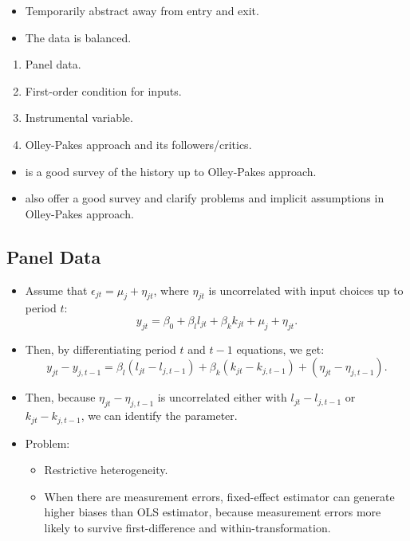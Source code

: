 \documentclass[
]{book}
\providecommand{\tightlist}{%
  \setlength{\itemsep}{0pt}\setlength{\parskip}{0pt}}
\begin{document}
\begin{itemize}
\tightlist
\item
  Temporarily abstract away from entry and exit.
\item
  The data is balanced.
\end{itemize}

\begin{enumerate}
\def\labelenumi{\arabic{enumi}.}
\tightlist
\item
  Panel data.
\item
  First-order condition for inputs.
\item
  Instrumental variable.
\item
  Olley-Pakes approach and its followers/critics.
\end{enumerate}

\begin{itemize}
\tightlist
\item
  \citet{Griliches1998} is a good survey of the history up to Olley-Pakes approach.
\item
  \citet{Ackerberg2015} also offer a good survey and clarify problems and implicit assumptions in Olley-Pakes approach.
\end{itemize}

\hypertarget{panel-data}{%
\subsection{Panel Data}\label{panel-data}}

\begin{itemize}
\tightlist
\item
  Assume that \(\epsilon_{jt} = \mu_j + \eta_{jt}\), where \(\eta_{jt}\) is uncorrelated with input choices up to period \(t\):
  \begin{equation}
  y_{jt} = \beta_0 + \beta_l l_{jt} + \beta_k k_{jt} + \mu_j + \eta_{jt}.
  \end{equation}
\item
  Then, by differentiating period \(t\) and \(t - 1\) equations, we get:
  \begin{equation}
  y_{jt} - y_{j, t - 1}= \beta_l (l_{jt} - l_{j, t - 1}) + \beta_k (k_{jt} - k_{j, t - 1}) + (\eta_{jt} - \eta_{j, t - 1}).
  \end{equation}
\item
  Then, because \(\eta_{jt} - \eta_{j, t - 1}\) is uncorrelated either with \(l_{jt} - l_{j, t - 1}\) or \(k_{jt} - k_{j, t - 1}\), we can identify the parameter.
\item
  Problem:

  \begin{itemize}
  \tightlist
  \item
    Restrictive heterogeneity.
  \item
    When there are measurement errors, fixed-effect estimator can generate higher biases than OLS estimator, because measurement errors more likely to survive first-difference and within-transformation.
  \end{itemize}
\end{itemize}
\end{document}
